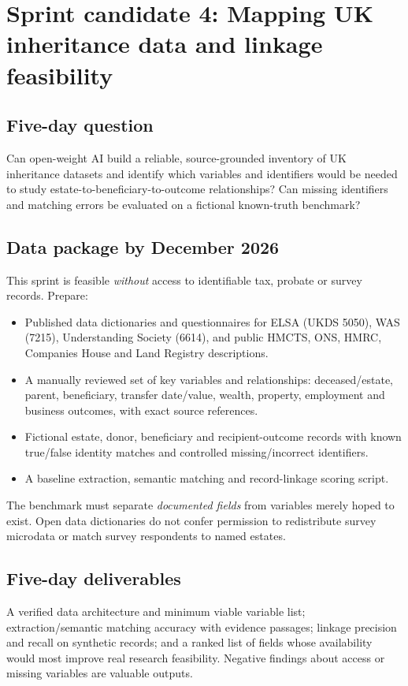 \section{Sprint candidate 4: Mapping UK inheritance data and linkage feasibility}
\label{sec:followon}

\subsection{Five-day question}
Can open-weight AI build a reliable, source-grounded inventory of UK inheritance datasets and identify which variables and identifiers would be needed to study estate-to-beneficiary-to-outcome relationships? Can missing identifiers and matching errors be evaluated on a fictional known-truth benchmark?

\subsection{Data package by December 2026}
This sprint is feasible \emph{without} access to identifiable tax, probate or survey records. Prepare:
\begin{itemize}[nosep]
\item Published data dictionaries and questionnaires for ELSA (UKDS 5050), WAS (7215), Understanding Society (6614), and public HMCTS, ONS, HMRC, Companies House and Land Registry descriptions.
\item A manually reviewed set of key variables and relationships: deceased/estate, parent, beneficiary, transfer date/value, wealth, property, employment and business outcomes, with exact source references.
\item Fictional estate, donor, beneficiary and recipient-outcome records with known true/false identity matches and controlled missing/incorrect identifiers.
\item A baseline extraction, semantic matching and record-linkage scoring script.
\end{itemize}

The benchmark must separate \emph{documented fields} from variables merely hoped to exist. Open data dictionaries do not confer permission to redistribute survey microdata or match survey respondents to named estates.

\subsection{Five-day deliverables}
A verified data architecture and minimum viable variable list; extraction/semantic matching accuracy with evidence passages; linkage precision and recall on synthetic records; and a ranked list of fields whose availability would most improve real research feasibility. Negative findings about access or missing variables are valuable outputs.

